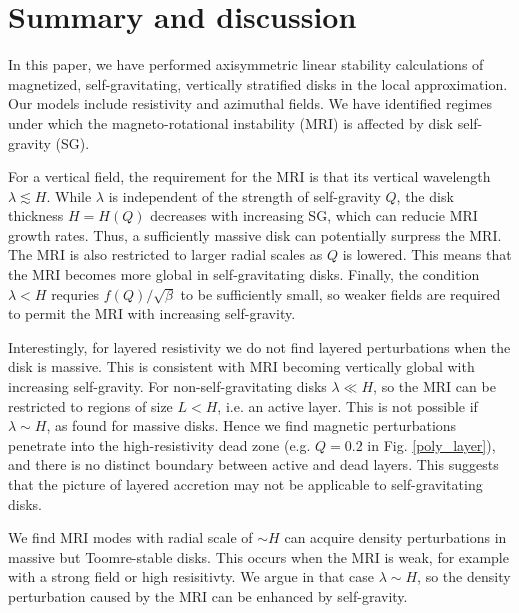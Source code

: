 \section{Summary and discussion}\label{summary}
In this paper, we have performed axisymmetric linear stability
calculations of magnetized, self-gravitating, vertically stratified
disks in the local approximation. Our models include resistivity and
azimuthal fields. We have identified regimes under which the
magneto-rotational instability (MRI) is affected by disk self-gravity
(SG).   


For a vertical field, the requirement for the MRI is that   
its vertical wavelength $\lambda \lesssim H$. While $\lambda$ is independent of
the strength of self-gravity $Q$, the disk thickness $H=H(Q)$ 
decreases with increasing SG, which can reducie MRI growth rates. 
Thus, a sufficiently massive disk can potentially surpress the MRI. 
The MRI is also restricted to larger radial
scales as $Q$ is lowered. This means that the MRI becomes more global
in self-gravitating disks. Finally, the condition $\lambda < H$ 
requries $f(Q)/\sqrt{\beta}$ to be sufficiently small, so weaker
fields are required to permit the MRI with increasing self-gravity.   

 
Interestingly, for layered resistivity we do not find layered
perturbations when the disk is massive. This is 
consistent with MRI becoming vertically global with increasing self-gravity.    
For non-self-gravitating disks $\lambda\ll H$, so the MRI can be
restricted to regions of size $L<H$, i.e. an active layer. This is not
possible if $\lambda \sim H$, as found for massive disks. Hence we
find magnetic perturbations penetrate into the high-resistivity dead
zone (e.g. $Q=0.2$ in Fig. \ref{poly_layer}), and there is no distinct
boundary between active and dead layers. This suggests that the
picture of layered accretion  \citep[e.g.][]{fleming03} may not be applicable 
to self-gravitating disks.  

We find MRI modes with radial scale of $\sim H$ can acquire  
density perturbations in massive but Toomre-stable disks. 
This occurs when the MRI is weak, for example with a strong field or
high resisitivty. We argue in that case $\lambda\sim H$, so the density
perturbation caused by the MRI can be enhanced by self-gravity.


